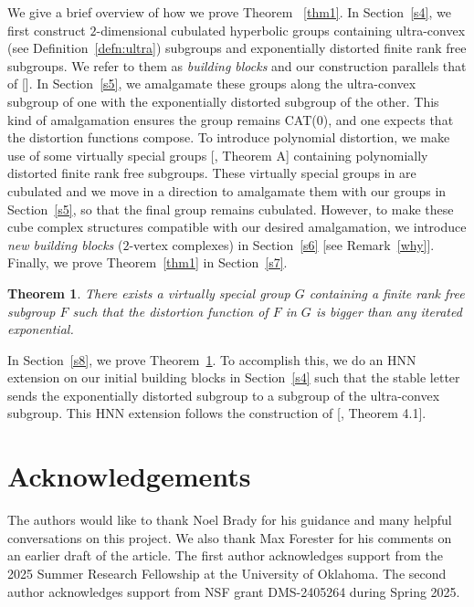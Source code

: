 \documentclass[oneside,11pt,reqno]{amsart}
\newtheorem{thm}{Theorem}[section]
\theoremstyle{definition}
\begin{document}
We give a brief overview of how we prove Theorem ~\ref{thm1}. In Section~\ref{s4}, we first construct $2$-dimensional cubulated hyperbolic groups containing ultra-convex (see Definition~\ref{defn:ultra}) subgroups and exponentially distorted finite rank free subgroups. We refer to them as \emph{building blocks} and our construction parallels that of [\cite{BBD}]. In Section~\ref{s5}, we amalgamate these groups along the ultra-convex subgroup of one with the exponentially distorted subgroup of the other. This kind of amalgamation ensures the group remains CAT($0$), and one expects that the distortion functions compose. To introduce polynomial distortion, we make use of some virtually special groups [\cite{BS}, Theorem A] containing polynomially distorted finite rank free subgroups. These virtually special groups in \cite{BS} are cubulated and we move in a direction to amalgamate them with our groups in Section~\ref{s5}, so that the final group remains cubulated. However, to make these cube complex structures compatible with our desired amalgamation, we introduce \emph{new building blocks} ($2$-vertex complexes) in Section~\ref{s6} [see Remark~\ref{why}]. Finally, we prove Theorem~\ref{thm1} in Section~\ref{s7}. 
 
\begin{thm}\label{thm2}
There exists a virtually special group $G$ containing a finite rank free subgroup $F$ such that the distortion function of $F$ in $G$ is bigger than any iterated exponential.
\end{thm}

 
In Section~\ref{s8}, we prove Theorem~\ref{thm2}. To accomplish this, we do an HNN extension on our initial building blocks in Section~\ref{s4} such that the stable letter sends the exponentially distorted subgroup to a subgroup of the ultra-convex subgroup. This HNN extension follows the construction of [\cite{BBD}, Theorem 4.1].  


\section{Acknowledgements}
The authors would like to thank Noel Brady for his guidance and many helpful conversations on this project. We also thank Max Forester for his comments on an earlier draft of the article. The first author acknowledges support from the 2025 Summer Research Fellowship at the University of Oklahoma. The second author acknowledges support from NSF grant DMS-2405264 during Spring 2025.
\end{document}
